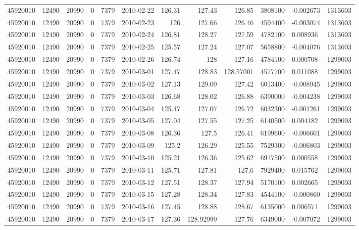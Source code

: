 \begin{tabular}{l | r | r | r | r | l | r | r | r | r | l | r}
45920010 & 12490 & 20990 & 0 & 7379 & 2010-02-22 & 126.31 & 127.43 & 126.85 & 3808100 & -0.002673 & 1313603 \\
45920010 & 12490 & 20990 & 0 & 7379 & 2010-02-23 & 126 & 127.66 & 126.46 & 4594400 & -0.003074 & 1313603 \\
45920010 & 12490 & 20990 & 0 & 7379 & 2010-02-24 & 126.81 & 128.27 & 127.59 & 4782100 & 0.008936 & 1313603 \\
45920010 & 12490 & 20990 & 0 & 7379 & 2010-02-25 & 125.57 & 127.24 & 127.07 & 5658800 & -0.004076 & 1313603 \\
45920010 & 12490 & 20990 & 0 & 7379 & 2010-02-26 & 126.74 & 128 & 127.16 & 4784100 & 0.000708 & 1299003 \\
45920010 & 12490 & 20990 & 0 & 7379 & 2010-03-01 & 127.47 & 128.83 & 128.57001 & 4577700 & 0.011088 & 1299003 \\
45920010 & 12490 & 20990 & 0 & 7379 & 2010-03-02 & 127.13 & 129.09 & 127.42 & 6013400 & -0.008945 & 1299003 \\
45920010 & 12490 & 20990 & 0 & 7379 & 2010-03-03 & 126.68 & 128.02 & 126.88 & 6390000 & -0.004238 & 1299003 \\
45920010 & 12490 & 20990 & 0 & 7379 & 2010-03-04 & 125.47 & 127.07 & 126.72 & 6032300 & -0.001261 & 1299003 \\
45920010 & 12490 & 20990 & 0 & 7379 & 2010-03-05 & 127.04 & 127.55 & 127.25 & 6140500 & 0.004182 & 1299003 \\
45920010 & 12490 & 20990 & 0 & 7379 & 2010-03-08 & 126.36 & 127.5 & 126.41 & 6199600 & -0.006601 & 1299003 \\
45920010 & 12490 & 20990 & 0 & 7379 & 2010-03-09 & 125.2 & 126.29 & 125.55 & 7529300 & -0.006803 & 1299003 \\
45920010 & 12490 & 20990 & 0 & 7379 & 2010-03-10 & 125.21 & 126.36 & 125.62 & 6917500 & 0.000558 & 1299003 \\
45920010 & 12490 & 20990 & 0 & 7379 & 2010-03-11 & 125.71 & 127.81 & 127.6 & 7929400 & 0.015762 & 1299003 \\
45920010 & 12490 & 20990 & 0 & 7379 & 2010-03-12 & 127.51 & 128.37 & 127.94 & 5170100 & 0.002665 & 1299003 \\
45920010 & 12490 & 20990 & 0 & 7379 & 2010-03-15 & 127.28 & 128.34 & 127.83 & 4544100 & -0.000860 & 1299003 \\
45920010 & 12490 & 20990 & 0 & 7379 & 2010-03-16 & 127.45 & 128.88 & 128.67 & 6135000 & 0.006571 & 1299003 \\
45920010 & 12490 & 20990 & 0 & 7379 & 2010-03-17 & 127.36 & 128.92999 & 127.76 & 6349000 & -0.007072 & 1299003 \\

\end{tabular}
